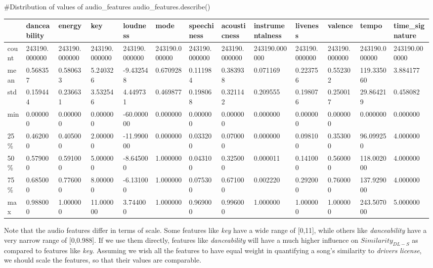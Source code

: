 \documentclass[
  letterpaper,
  DIV=11,
  numbers=noendperiod]{scrreprt}
\newenvironment{Shaded}{\begin{snugshade}}{\end{snugshade}}
\newcommand{\CommentTok}[1]{\textcolor[rgb]{0.37,0.37,0.37}{#1}}
\newcommand{\NormalTok}[1]{\textcolor[rgb]{0.00,0.23,0.31}{#1}}
\begin{document}
\begin{Shaded}
\begin{Highlighting}[]
\CommentTok{\#Distribution of values of audio\_features}
\NormalTok{audio\_features.describe()}
\end{Highlighting}
\end{Shaded}

\begin{longtable}[]{@{}lllllllllllll@{}}
\toprule\noalign{}
& danceability & energy & key & loudness & mode & speechiness &
acousticness & instrumentalness & liveness & valence & tempo &
time\_signature \\
\midrule\noalign{}
\endhead
\bottomrule\noalign{}
\endlastfoot
count & 243190.000000 & 243190.000000 & 243190.000000 & 243190.000000 &
243190.000000 & 243190.000000 & 243190.000000 & 243190.000000 &
243190.000000 & 243190.000000 & 243190.000000 & 243190.000000 \\
mean & 0.568357 & 0.580633 & 5.240326 & -9.432548 & 0.670928 & 0.111984
& 0.383938 & 0.071169 & 0.223756 & 0.552302 & 119.335060 & 3.884177 \\
std & 0.159444 & 0.236631 & 3.532546 & 4.449731 & 0.469877 & 0.198068 &
0.321142 & 0.209555 & 0.198076 & 0.250017 & 29.864219 & 0.458082 \\
min & 0.000000 & 0.000000 & 0.000000 & -60.000000 & 0.000000 & 0.000000
& 0.000000 & 0.000000 & 0.000000 & 0.000000 & 0.000000 & 0.000000 \\
25\% & 0.462000 & 0.405000 & 2.000000 & -11.990000 & 0.000000 & 0.033200
& 0.070000 & 0.000000 & 0.098100 & 0.353000 & 96.099250 & 4.000000 \\
50\% & 0.579000 & 0.591000 & 5.000000 & -8.645000 & 1.000000 & 0.043100
& 0.325000 & 0.000011 & 0.141000 & 0.560000 & 118.002000 & 4.000000 \\
75\% & 0.685000 & 0.776000 & 8.000000 & -6.131000 & 1.000000 & 0.075300
& 0.671000 & 0.002220 & 0.292000 & 0.760000 & 137.929000 & 4.000000 \\
max & 0.988000 & 1.000000 & 11.000000 & 3.744000 & 1.000000 & 0.969000 &
0.996000 & 1.000000 & 1.000000 & 1.000000 & 243.507000 & 5.000000 \\
\end{longtable}

Note that the audio features differ in terms of scale. Some features
like \emph{key} have a wide range of {[}0,11{]}, while others like
\emph{danceability} have a very narrow range of {[}0,0.988{]}. If we use
them directly, features like \emph{danceability} will have a much higher
influence on \(Similarity_{DL-S}\) as compared to features like
\emph{key}. Assuming we wish all the features to have equal weight in
quantifying a song's similarity to \emph{drivers license}, we should
scale the features, so that their values are comparable.
\end{document}

